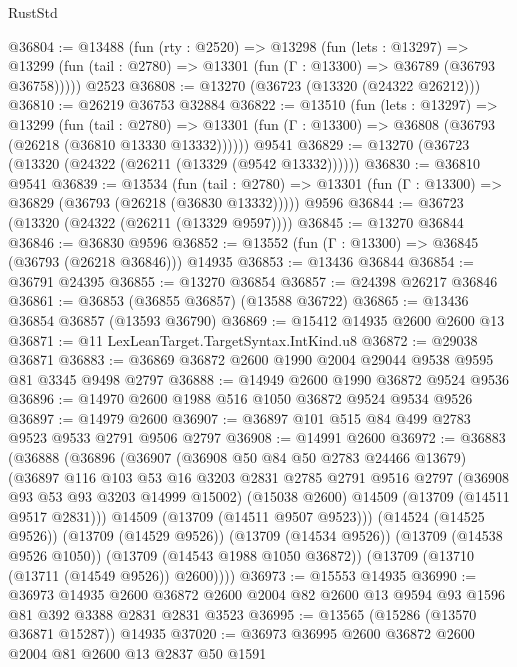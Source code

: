 \begin{lexlean}{RustStd}
\begin{coremodule}
@36804 := @13488
    (fun (rty : @2520) =>
    @13298
      (fun (lets : @13297) =>
      @13299 (fun (tail : @2780) => @13301 (fun (Γ : @13300) => @36789 (@36793 @36758)))))
    @2523
@36808 := @13270 (@36723 (@13320 (@24322 @26212)))
@36810 := @26219 @36753 @32884
@36822 := @13510
    (fun (lets : @13297) =>
    @13299
      (fun (tail : @2780) =>
      @13301 (fun (Γ : @13300) => @36808 (@36793 (@26218 (@36810 @13330 @13332))))))
    @9541
@36829 := @13270 (@36723 (@13320 (@24322 (@26211 (@13329 (@9542 @13332))))))
@36830 := @36810 @9541
@36839 := @13534
    (fun (tail : @2780) => @13301 (fun (Γ : @13300) => @36829 (@36793 (@26218 (@36830 @13332)))))
    @9596
@36844 := @36723 (@13320 (@24322 (@26211 (@13329 @9597))))
@36845 := @13270 @36844
@36846 := @36830 @9596
@36852 := @13552 (fun (Γ : @13300) => @36845 (@36793 (@26218 @36846))) @14935
@36853 := @13436 @36844
@36854 := @36791 @24395
@36855 := @13270 @36854
@36857 := @24398 @26217 @36846
@36861 := @36853 (@36855 @36857) (@13588 @36722)
@36865 := @13436 @36854 @36857 (@13593 @36790)
@36869 := @15412 @14935 @2600 @2600 @13
@36871 := @11 LexLeanTarget.TargetSyntax.IntKind.u8
@36872 := @29038 @36871
@36883 := @36869 @36872 @2600 @1990 @2004 @29044 @9538 @9595 @81 @3345 @9498 @2797
@36888 := @14949 @2600 @1990 @36872 @9524 @9536
@36896 := @14970 @2600 @1988 @516 @1050 @36872 @9524 @9534 @9526
@36897 := @14979 @2600
@36907 := @36897 @101 @515 @84 @499 @2783 @9523 @9533 @2791 @9506 @2797
@36908 := @14991 @2600
@36972 := @36883
    (@36888
      (@36896
        (@36907
          (@36908 @50 @84 @50 @2783 @24466 @13679)
          (@36897
            @116
            @103
            @53
            @16
            @3203
            @2831
            @2785
            @2791
            @9516
            @2797
            (@36908 @93 @53 @93 @3203 @14999 @15002)
            (@15038 @2600)
            @14509
            (@13709 (@14511 @9517 @2831)))
          @14509
          (@13709 (@14511 @9507 @9523)))
        (@14524 (@14525 @9526))
        (@13709 (@14529 @9526))
        (@13709 (@14534 @9526))
        (@13709 (@14538 @9526 @1050))
        (@13709 (@14543 @1988 @1050 @36872))
        (@13709 (@13710 (@13711 (@14549 @9526)) @2600))))
@36973 := @15553 @14935
@36990 := @36973
    @14935
    @2600
    @36872
    @2600
    @2004
    @82
    @2600
    @13
    @9594
    @93
    @1596
    @81
    @392
    @3388
    @2831
    @2831
    @3523
@36995 := @13565 (@15286 (@13570 @36871 @15287)) @14935
@37020 := @36973
    @36995
    @2600
    @36872
    @2600
    @2004
    @81
    @2600
    @13
    @2837
    @50
    @1591

\end{coremodule}
\end{lexlean}

